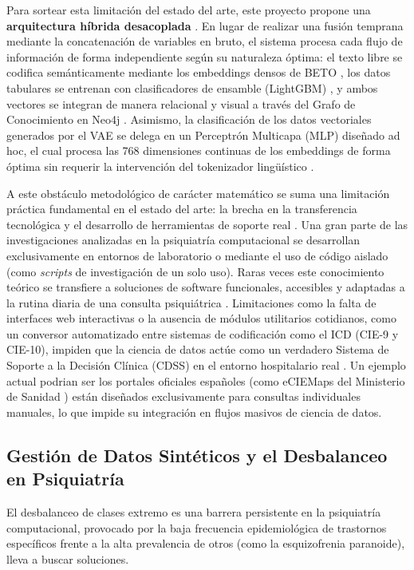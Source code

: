 \documentclass[12pt,a4paper,onecolumn,oneside]{report}
\begin{document}
Para sortear esta limitación del estado del arte, este proyecto propone una \textbf{arquitectura híbrida desacoplada} \cite{lopez2026ia}. En lugar de realizar una fusión temprana mediante la concatenación de variables en bruto, el sistema procesa cada flujo de información de forma independiente según su naturaleza óptima: el texto libre se codifica semánticamente mediante los embeddings densos de BETO \cite{vidal2023algoritmo}, los datos tabulares se entrenan con clasificadores de ensamble (LightGBM) \cite{saboori2025predictive}, y ambos vectores se integran de manera relacional y visual a través del Grafo de Conocimiento en Neo4j \cite{lopez2026ia}. Asimismo, la clasificación de los datos vectoriales generados por el VAE se delega en un Perceptrón Multicapa (MLP) diseñado ad hoc, el cual procesa las 768 dimensiones continuas de los embeddings de forma óptima sin requerir la intervención del tokenizador lingüístico \cite{saboori2025predictive}.

A este obstáculo metodológico de carácter matemático se suma una limitación práctica fundamental en el estado del arte: la brecha en la transferencia tecnológica y el desarrollo de herramientas de soporte real \cite{lopez2026ia}. Una gran parte de las investigaciones analizadas en la psiquiatría computacional se desarrollan exclusivamente en entornos de laboratorio o mediante el uso de código aislado (como \textit{scripts} de investigación de un solo uso). Raras veces este conocimiento teórico se transfiere a soluciones de software funcionales, accesibles y adaptadas a la rutina diaria de una consulta psiquiátrica \cite{lopez2026ia}. Limitaciones como la falta de interfaces web interactivas o la ausencia de módulos utilitarios cotidianos, como un conversor automatizado entre sistemas de codificación como el ICD (CIE-9 y CIE-10), impiden que la ciencia de datos actúe como un verdadero Sistema de Soporte a la Decisión Clínica (CDSS) en el entorno hospitalario real \cite{lopez2026ia}. Un ejemplo actual podrian ser los portales oficiales españoles (como eCIEMaps del Ministerio de Sanidad \cite{eciemaps_sanidad}) están diseñados exclusivamente para consultas individuales manuales, lo que impide su integración en flujos masivos de ciencia de datos.

\subsection{Gestión de Datos Sintéticos y el Desbalanceo en Psiquiatría}
El desbalanceo de clases extremo es una barrera persistente en la psiquiatría computacional, provocado por la baja frecuencia epidemiológica de trastornos específicos frente a la alta prevalencia de otros (como la esquizofrenia paranoide), lleva a buscar soluciones. 
\end{document}
